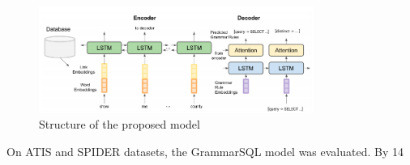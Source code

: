 \begin{figure}[htb]
    \centering
    \includegraphics[width=0.8\textwidth]{pics/GrammarSQL.png}
    \caption{Structure of the proposed model}
    \label{fig:GrammarSQL}
\end{figure}


On ATIS and SPIDER datasets, the GrammarSQL model was evaluated. By 14%